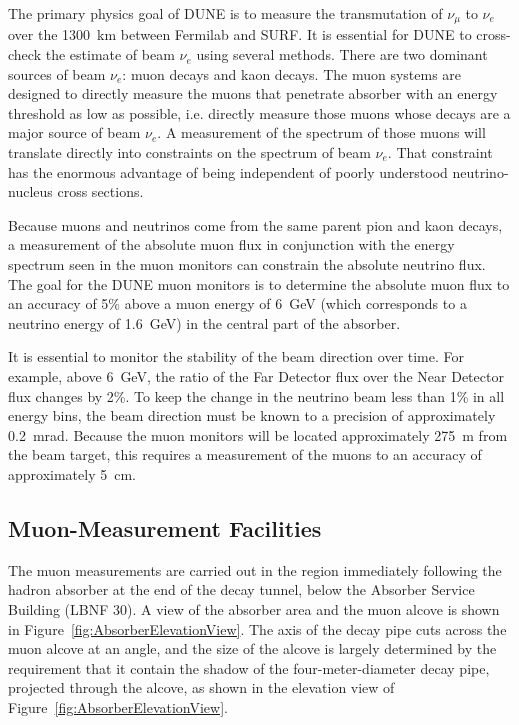 The primary physics goal of DUNE is to measure the transmutation
of $\nu_\mu$ to $\nu_e$ over the 1300~km between Fermilab
and SURF. It is essential for DUNE to cross-check the estimate of 
beam $\nu_e$ using several methods.
There are two dominant sources of beam $\nu_e$: muon decays and kaon decays. 
The muon systems are designed to directly measure the 
muons that penetrate absorber with an energy 
threshold as low as possible, i.e. directly measure those muons 
whose decays are a major source of beam $\nu_e$. 
A measurement of the spectrum of those muons will translate
 directly into constraints on the spectrum of beam $\nu_e$.
That constraint has the enormous advantage of being independent of poorly understood 
neutrino-nucleus cross sections.

Because muons and neutrinos come from the same parent pion and kaon
decays, a measurement of the absolute muon flux in conjunction with the energy spectrum
seen in the muon monitors can constrain the absolute neutrino flux.  
The goal for the DUNE muon monitors is to determine the absolute muon flux
to an accuracy of 5\% above a muon energy of 6~GeV (which corresponds to
a neutrino energy of 1.6~GeV) in the central part of the absorber.

It is essential to monitor the stability of the beam direction over
time. For example, above 6~GeV, the ratio of the Far Detector flux over 
the Near Detector flux changes by 2\%.  
To keep the change in the neutrino beam less than 1\% in all energy bins,
the beam direction must be known to a precision of approximately 0.2~mrad. 
Because the muon monitors will be located approximately 275~m
from the beam target, this requires a measurement of the muons to an
accuracy of approximately 5~cm.

%
%
\subsection{Muon-Measurement Facilities}
\label{subsec:detectors-nd-blm-muon-measurement-facilities}

The muon measurements are carried out in the region immediately
following the hadron absorber at the end of the decay tunnel, below
the Absorber Service Building (LBNF 30).  A view of the absorber area
and the muon alcove is shown in
Figure~\ref{fig:AbsorberElevationView}.  The axis of the decay pipe
cuts across the muon alcove at an angle, and the size of the alcove is
largely determined by the requirement that it contain the shadow of
the four-meter-diameter decay pipe, projected through the alcove, as
shown in the elevation view of Figure~\ref{fig:AbsorberElevationView}.

